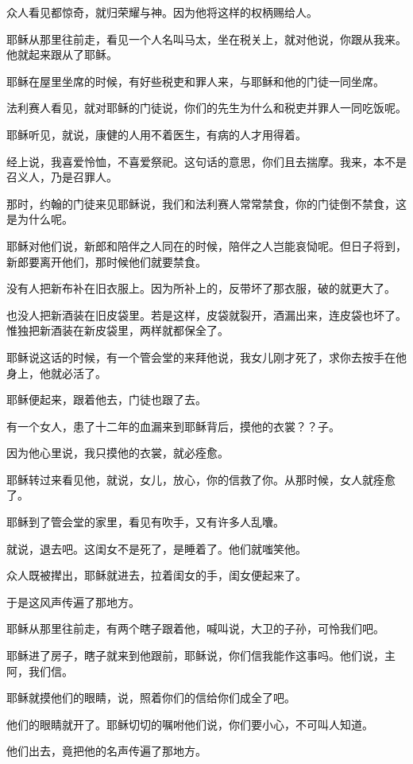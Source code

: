\documentclass[12pt,oneside]{book}
\begin{document}
众人看见都惊奇，就归荣耀与神。因为他将这样的权柄赐给人。

耶稣从那里往前走，看见一个人名叫马太，坐在税关上，就对他说，你跟从我来。他就起来跟从了耶稣。

耶稣在屋里坐席的时候，有好些税吏和罪人来，与耶稣和他的门徒一同坐席。

法利赛人看见，就对耶稣的门徒说，你们的先生为什么和税吏并罪人一同吃饭呢。

耶稣听见，就说，康健的人用不着医生，有病的人才用得着。

经上说，我喜爱怜恤，不喜爱祭祀。这句话的意思，你们且去揣摩。我来，本不是召义人，乃是召罪人。

那时，约翰的门徒来见耶稣说，我们和法利赛人常常禁食，你的门徒倒不禁食，这是为什么呢。

耶稣对他们说，新郎和陪伴之人同在的时候，陪伴之人岂能哀恸呢。但日子将到，新郎要离开他们，那时候他们就要禁食。

没有人把新布补在旧衣服上。因为所补上的，反带坏了那衣服，破的就更大了。

也没人把新酒装在旧皮袋里。若是这样，皮袋就裂开，酒漏出来，连皮袋也坏了。惟独把新酒装在新皮袋里，两样就都保全了。

耶稣说这话的时候，有一个管会堂的来拜他说，我女儿刚才死了，求你去按手在他身上，他就必活了。

耶稣便起来，跟着他去，门徒也跟了去。

有一个女人，患了十二年的血漏来到耶稣背后，摸他的衣裳？？子。

因为他心里说，我只摸他的衣裳，就必痊愈。

耶稣转过来看见他，就说，女儿，放心，你的信救了你。从那时候，女人就痊愈了。

耶稣到了管会堂的家里，看见有吹手，又有许多人乱囔。

就说，退去吧。这闺女不是死了，是睡着了。他们就嗤笑他。

众人既被撵出，耶稣就进去，拉着闺女的手，闺女便起来了。

于是这风声传遍了那地方。

耶稣从那里往前走，有两个瞎子跟着他，喊叫说，大卫的子孙，可怜我们吧。

耶稣进了房子，瞎子就来到他跟前，耶稣说，你们信我能作这事吗。他们说，主阿，我们信。

耶稣就摸他们的眼睛，说，照着你们的信给你们成全了吧。

他们的眼睛就开了。耶稣切切的嘱咐他们说，你们要小心，不可叫人知道。

他们出去，竟把他的名声传遍了那地方。
\end{document}
